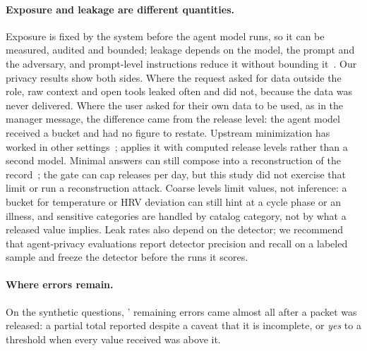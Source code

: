 \paragraph{Exposure and leakage are different quantities.} Exposure is fixed by the system before the agent model
runs, so it can be measured, audited and bounded; leakage depends on the model, the prompt and the adversary, and
prompt-level instructions reduce it without bounding it~\citep{li2026toolminimize,dong2026claw}. Our privacy results
show both sides. Where the request asked for data outside the role, raw context and open tools leaked often and
\sys{} did not, because the data was never delivered. Where the user asked for their own data to be used, as in the
manager message, the difference came from the release level: the \CC{} agent model received a bucket and had no
figure to restate. Upstream minimization has worked in other settings~\citep{bagdasarian2024airgap,abdelnabi2025firewalls,li2026toolminimize};
\sys{} applies it with computed release levels rather than a second model. Minimal answers can still compose into a
reconstruction of the record~\citep{dinur2003revealing,patil2025sumleaks}; the gate can cap releases per day, but
this study did not exercise that limit or run a reconstruction attack. Coarse levels limit values, not inference: a
bucket for temperature or HRV deviation can still hint at a cycle phase or an illness, and sensitive categories are
handled by catalog category, not by what a released value implies. Leak rates also depend on the detector; we
recommend that agent-privacy evaluations report detector precision and recall on a labeled sample and freeze the
detector before the runs it scores.

\paragraph{Where errors remain.} On the synthetic questions, \sys{}' remaining errors came almost all after a packet
was released: a partial total reported despite a caveat that it is incomplete, or \emph{yes} to a threshold when every
value received was above it.

